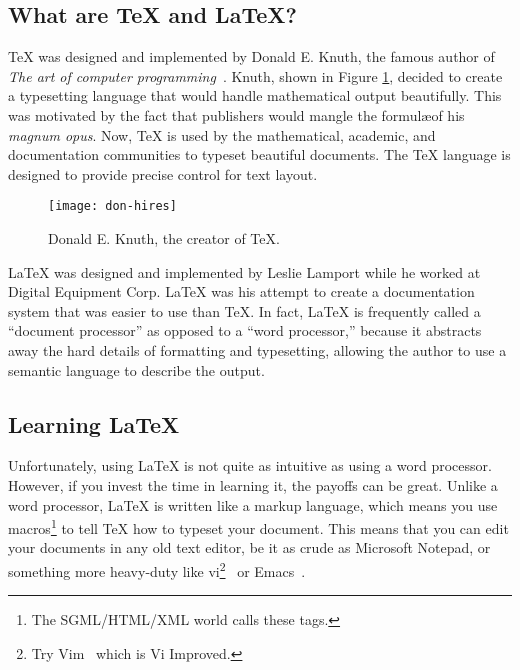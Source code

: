 \documentclass{uw-wkrpt}
\begin{document}
\subsection{What are \TeX{} and \LaTeX{}?}
%
\TeX{} was designed and implemented by Donald E. Knuth, the famous author
of \textit{The art of computer programming}~\cite{ref:taocp}.  Knuth,
shown in Figure \ref{fig:knuth}, decided to create a typesetting language
that would handle mathematical output beautifully.  This was motivated
by the fact that publishers would mangle the formul\ae of his
\textit{magnum opus}.  Now, \TeX{} is used by the mathematical,
academic, and documentation communities to typeset beautiful
documents.  The \TeX{} language is designed to provide precise control
for text layout.

%
\begin{figure}
  \centering
  \texttt{[image: don-hires]}
  \caption[Donald E. Knuth, the creator of \TeX{}.]
          {Donald E. Knuth, the creator of \TeX{}.~\cite{ref:donpicture}}
  \label{fig:knuth}
\end{figure}

\LaTeX{} was designed and implemented by Leslie Lamport while he worked
at Digital Equipment Corp.  \LaTeX{} was his attempt to create a
documentation system that was easier to use than \TeX{}.  In fact,
\LaTeX{} is frequently called a ``document processor'' as opposed to a
``word processor,'' because it abstracts away the hard details of
formatting and typesetting, allowing the author to use a semantic
language to describe the output.


\subsection{Learning \LaTeX}
\newcommand{\us}{\hspace{-0.1ex}}
\newcommand{\teTeX}{\mbox{t\us e\us\us\TeX}}
\newcommand{\MiKTeX}{\mbox{M\us i\us K\us\us\TeX}}
%
Unfortunately, using \LaTeX{} is not quite as intuitive as using a
word processor.  However, if you invest the time in learning it, the
payoffs can be great.  Unlike a word processor, \LaTeX{} is written
like a markup language, which means you use macros\footnote{The 
SGML/HTML/XML world calls these tags.} to tell \TeX{} how to typeset
your document.  This means that you can edit your documents in any
old text editor, be it as crude as Microsoft Notepad, or something
more heavy-duty like vi\footnote{Try Vim~\cite{ref:vim} which is 
Vi Improved.}~\cite{ref:vi} or Emacs~\cite{ref:emacs}.
\end{document}
